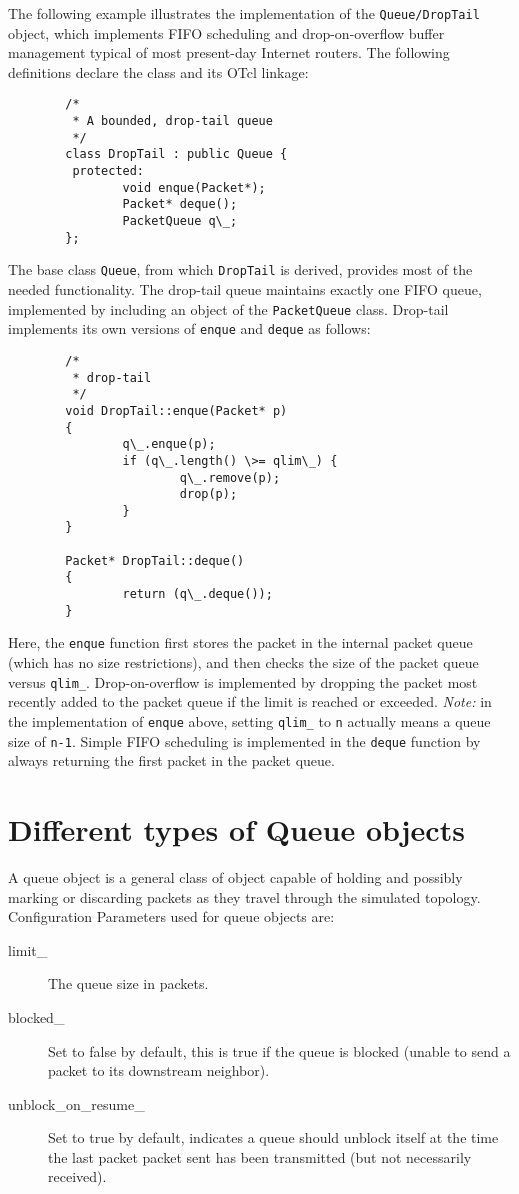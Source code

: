 The following example illustrates the implementation of the
{\tt Queue/DropTail} object,
which implements FIFO scheduling and
drop-on-overflow buffer management typical of most present-day
Internet routers.
The following definitions declare the class and its OTcl linkage:
\begin{verbatim}
        /*
         * A bounded, drop-tail queue
         */
        class DropTail : public Queue {
         protected:
                void enque(Packet*);
                Packet* deque();
                PacketQueue q\_;
        };
\end{verbatim}
The base class {\tt Queue},
from which {\tt DropTail} is derived, provides most
of the needed functionality.
The drop-tail queue maintains exactly one FIFO queue, implemented
by including an object of the {\tt PacketQueue} class.
Drop-tail implements its own versions of {\tt enque} and {\tt deque}
as follows:
\begin{verbatim}
        /*
         * drop-tail
         */
        void DropTail::enque(Packet* p)
        {
                q\_.enque(p);
                if (q\_.length() \>= qlim\_) {
                        q\_.remove(p);
                        drop(p);
                }
        }

        Packet* DropTail::deque()
        {
                return (q\_.deque());
        }
\end{verbatim}
Here, the {\tt enque} function first stores the packet in the
internal packet queue (which has no size restrictions), and then
checks the size of the packet queue versus {\tt qlim\_}.
Drop-on-overflow is implemented by dropping the packet most recently
added to the packet queue if the limit is reached or exceeded.
\emph{Note:} in the implementation of {\tt enque} above, 
 setting {\tt qlim\_} to {\tt n} actually means a queue size of {\tt n-1}.
Simple FIFO scheduling is implemented in the {\tt deque} function
by always returning the first packet in the packet queue.


\section{Different types of Queue objects}
\label{sec:queueobjects}
A queue object is a general class of object capable of holding and
possibly marking or discarding packets as they travel through the
simulated topology. Configuration Parameters used for queue objects are:
\begin{description}
\item[limit\_] The queue size in packets. 

\item[blocked\_] Set to false by default, this is true if the queue is
blocked (unable to send a packet to its downstream neighbor). 

\item[unblock\_on\_resume\_] Set to true by default, indicates a queue
should unblock itself at the time the last packet packet sent has been
transmitted (but not necessarily received). 
\end{description}

